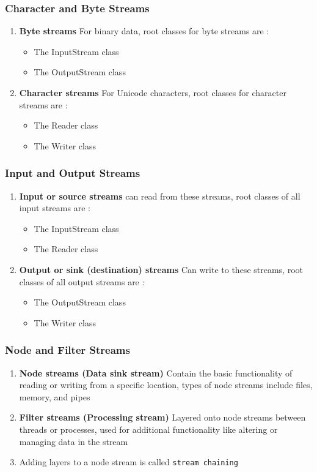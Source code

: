 \documentclass[11pt,a4paper]{article}
\begin{document}
\subsubsection*{Character and Byte Streams}
\begin{enumerate}
\item \textbf{Byte streams} For binary data, root classes for byte streams are : 
\begin{itemize}
\item The InputStream class 
\item The OutputStream class  
\end{itemize}
\item \textbf{Character streams} For Unicode characters, root classes for character streams are : 
\begin{itemize}
\item The Reader class 
\item The Writer class 
\end{itemize}
\end{enumerate} 
\subsubsection*{Input and Output Streams}
\begin{enumerate}
    \item \textbf{Input or source streams} can read from these streams, root classes of all input streams are : 
        \begin{itemize}
            \item The InputStream class 
            \item The Reader class
                   \end{itemize}
    \item \textbf{Output or sink (destination) streams} Can write to these streams, root classes of all output streams are : 
        \begin{itemize}
            \item The OutputStream class 
            \item The Writer class 
        \end{itemize}
\end{enumerate}

\subsubsection*{Node and Filter Streams}
\begin{enumerate}
\item \textbf{Node streams (Data sink stream)} Contain the basic functionality of reading or writing from a specific location, types of node streams include files, memory, and pipes
\item \textbf{Filter streams (Processing stream)} Layered onto node streams between threads or processes, used for additional functionality like altering or managing data in the stream
\item Adding layers to a node stream is called \texttt{stream chaining}
\end{enumerate}
\end{document}

